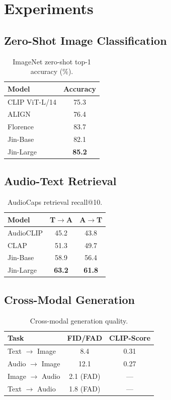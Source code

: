 \documentclass[11pt,twocolumn]{article}
\begin{document}
\section{Experiments}

\subsection{Zero-Shot Image Classification}

\begin{table}[h]
\centering
\caption{ImageNet zero-shot top-1 accuracy (\%).}
\label{tab:imagenet}
\begin{tabular}{lc}
\toprule
\textbf{Model} & \textbf{Accuracy} \\
\midrule
CLIP ViT-L/14 & 75.3 \\
ALIGN & 76.4 \\
Florence & 83.7 \\
\midrule
Jin-Base & 82.1 \\
Jin-Large & \textbf{85.2} \\
\bottomrule
\end{tabular}
\end{table}

\subsection{Audio-Text Retrieval}

\begin{table}[h]
\centering
\caption{AudioCaps retrieval recall@10.}
\label{tab:audiocaps}
\begin{tabular}{lcc}
\toprule
\textbf{Model} & \textbf{T$\rightarrow$A} & \textbf{A$\rightarrow$T} \\
\midrule
AudioCLIP & 45.2 & 43.8 \\
CLAP & 51.3 & 49.7 \\
\midrule
Jin-Base & 58.9 & 56.4 \\
Jin-Large & \textbf{63.2} & \textbf{61.8} \\
\bottomrule
\end{tabular}
\end{table}

\subsection{Cross-Modal Generation}

\begin{table}[h]
\centering
\caption{Cross-modal generation quality.}
\label{tab:generation}
\begin{tabular}{lcc}
\toprule
\textbf{Task} & \textbf{FID/FAD} & \textbf{CLIP-Score} \\
\midrule
Text $\rightarrow$ Image & 8.4 & 0.31 \\
Audio $\rightarrow$ Image & 12.1 & 0.27 \\
Image $\rightarrow$ Audio & 2.1 (FAD) & --- \\
Text $\rightarrow$ Audio & 1.8 (FAD) & --- \\
\bottomrule
\end{tabular}
\end{table}
\end{document}

